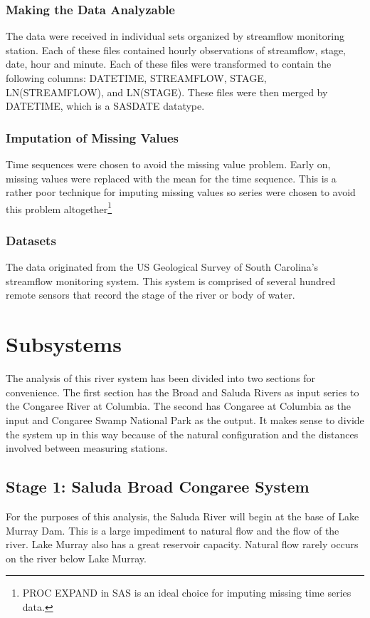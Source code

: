 \documentclass[12pt]{report}
\begin{document}
\subsubsection{Making the Data Analyzable}
The data were received in individual sets organized by streamflow
monitoring station.  Each of these files contained hourly
observations of streamflow, stage, date, hour and minute.  Each of
these files were transformed to contain the following columns:
DATETIME, STREAMFLOW, STAGE, LN(STREAMFLOW), and LN(STAGE).  These
files were then merged by DATETIME, which is a SASDATE datatype.


\subsubsection{Imputation of Missing Values}
Time sequences were chosen to avoid the missing value problem.
Early on, missing values were replaced with the mean for the time
sequence.  This is a rather poor technique for imputing missing
values so series were chosen to avoid this problem
altogether\footnote{PROC EXPAND in SAS is an ideal choice for
imputing missing time series data.}

\subsubsection{Datasets}
The data originated from the US Geological Survey of South
Carolina's streamflow monitoring system.  This system is comprised
of several hundred remote sensors that record the stage of the
river or body of water.


\section{Subsystems}
The analysis of this river system has been divided into two
sections for convenience.  The first section has the Broad and
Saluda Rivers as input series to the Congaree River at Columbia.
The second has Congaree at Columbia as the input and Congaree
Swamp National Park as the output. It makes sense to divide the
system up in this way because of the natural configuration and the
distances involved between measuring stations.

\subsection{Stage 1: Saluda Broad Congaree System}
For the purposes of this analysis, the Saluda River will begin at
the base of Lake Murray Dam.  This is a large impediment to
natural flow and the flow of the river. Lake Murray also has a
great reservoir capacity.  Natural flow rarely occurs on the river
below Lake Murray.
\end{document}
